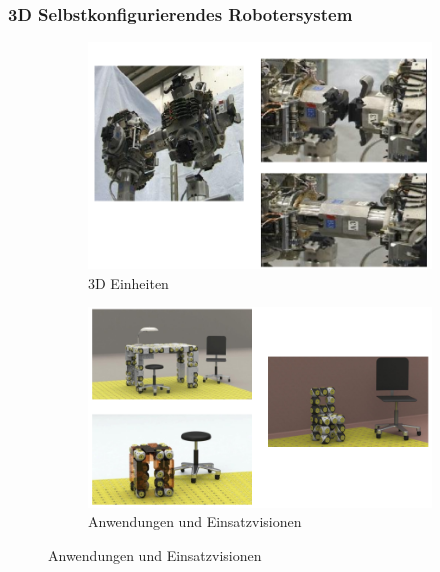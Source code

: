 \subsubsection{3D Selbstkonfigurierendes Robotersystem}
\begin{figure}[!htb]
	\centering
	\begin{subfigure}{.45\textwidth}
		\includegraphics[width=\textwidth]{figures/ch11_3d.png}
		\caption{3D Einheiten}
		\label{3d}
	\end{subfigure}
	\begin{subfigure}{.45\textwidth}
		\includegraphics[width=\textwidth]{figures/ch11_einsatz.png}
		\caption{Anwendungen und Einsatzvisionen}
		\label{einsatz}
	\end{subfigure}
\end{figure}
\newpage